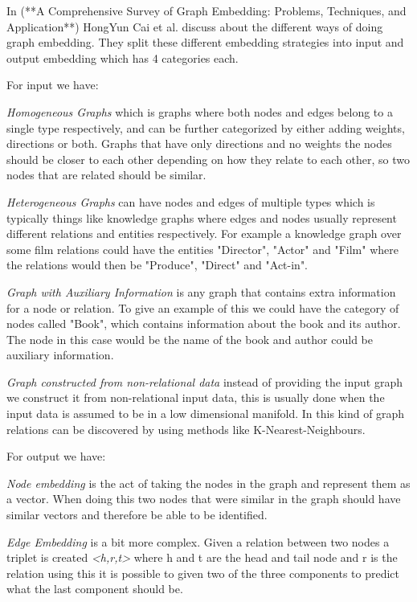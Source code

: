 In (**A Comprehensive Survey of Graph Embedding: Problems, Techniques, and Application**) HongYun Cai et al. discuss about the different ways of doing graph embedding. They split these different embedding strategies into input and output embedding which has 4 categories each. 

For input we have:

\textit{Homogeneous Graphs} which is graphs where both nodes and edges belong to a single type respectively, and can be further categorized by either adding weights, directions or both. Graphs that have only directions and no weights the nodes should be closer to each other depending on how they relate to each other, so two nodes that are related should be similar.

\textit{Heterogeneous Graphs} can have nodes and edges of multiple types which is typically things like knowledge graphs where edges and nodes usually represent different relations and entities respectively. For example a knowledge graph over some film relations could have the entities "Director", "Actor" and "Film" where the relations would then be "Produce", "Direct" and "Act-in".

\textit{Graph with Auxiliary Information} is any graph that contains extra information for a node or relation. To give an example of this we could have the category of nodes called "Book", which contains information about the book and its author. The node in this case would be the name of the book and author could be auxiliary information.

\textit{Graph constructed from non-relational data} instead of providing the input graph we construct it from non-relational input data, this is usually done when the input data is assumed to be in a low dimensional manifold. In this kind of graph relations can be discovered by using methods like K-Nearest-Neighbours.

For output we have:

\textit{Node embedding} is the act of taking the nodes in the graph and represent them as a vector. When doing this two nodes that were similar in the graph should have similar vectors and therefore be able to be identified.

\textit{Edge Embedding} is a bit more complex. Given a relation between two nodes a triplet is created \textit{<h,r,t>}  where h and t are the head and tail node and r is the relation using this it is possible to given two of the three components to predict what the last component should be.

